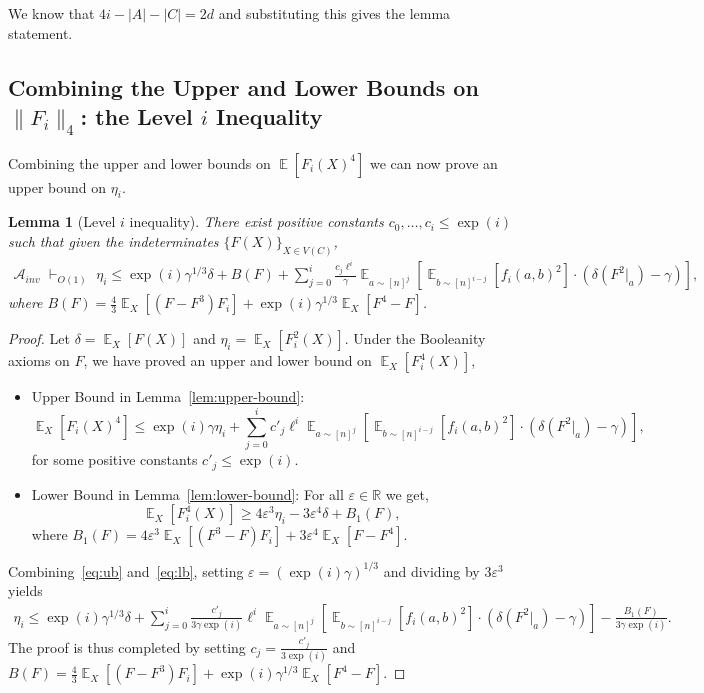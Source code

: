 \documentclass[11pt]{article}
\DeclareMathOperator*{\E}{\mathbb{E}}
\def \R {\mathbb{R}}
\def \cA {\mathcal{A}}
\def \eps {{\varepsilon}}
\newtheorem{lemma}[theorem]{Lemma}
\theoremstyle{definition}
\begin{document}
We know that $4i - |A|-|C| = 2d$ and substituting this gives the lemma statement.




\subsection{Combining the Upper and Lower Bounds on $\|F_i\|_4$: the Level $i$ Inequality}
Combining the upper and lower bounds on $\E[F_i(X)^4]$ we can now prove an upper bound on $\eta_i$.

\begin{lemma}[Level $i$ inequality]\label{lem:leveli-j}
There exist positive constants $c_0,\ldots,c_i \leq \exp(i)$ such that given the indeterminates $\{F(X)\}_{X \in V(C)}$,
\begin{align*}
\cA_{inv} \,\, \vdash_{O(1)}\,\, 
\eta_i \leq \exp(i)\gamma^{1/3}\delta + B(F) + \sum_{j = 0}^i  \frac{c_j\ell^{i}}{\gamma}\E_{a \sim [n]^{j}}[\E_{b \sim [n]^{i-j}}[f_i(a,b)^2]\cdot (\delta(F^{ 2}|_a) - \gamma)],
\end{align*}
where $B(F) =  \frac{4}{3}\E_X[(F - F^{ 3})F_i] + \exp(i)\gamma^{1/3}\E_X[F^{ 4} - F]$.
\end{lemma}

\begin{proof}
Let $\delta = \E_X[F(X)]$ and $\eta_i = \E_X[F_i^2(X)]$. Under the Booleanity axioms on $F$, we have proved an upper and lower bound on ${\E_X[F_i^4(X)]}$,
\begin{itemize}
    \item Upper Bound in Lemma~\ref{lem:upper-bound}:
\begin{equation}\label{eq:ub}
\E_X[F_i(X)^4] \leq \exp(i)\gamma \eta_i + \sum_{j = 0}^i c'_j \ell^{i}\E_{a \sim [n]^{j}}[\E_{b \sim [n]^{i-j}}[f_i(a,b)^2]\cdot (\delta(F^{2}|_a) - \gamma)],
\end{equation}
for some positive constants $c'_j \leq \exp(i)$.

\item Lower Bound in Lemma~\ref{lem:lower-bound}: For all $\eps \in \R$ we get,
\begin{equation}\label{eq:lb}
\E_X[F_i^4(X)] \geq 4\eps^3 \eta_i - 3\eps^4\delta + B_1(F),
\end{equation}
where $B_1(F) = 4\eps^3\E_X[(F^{ 3} - F)F_i]+3\eps^4 \E_X[F - F^{ 4}]$.
\end{itemize}

Combining~\eqref{eq:ub} and~\eqref{eq:lb}, 
setting $\eps = (\exp(i)\gamma)^{1/3}$ and dividing 
by $3\eps^3$ yields
\begin{align*}
\eta_i \leq \exp(i)\gamma^{1/3}\delta + \sum_{j = 0}^i \frac{c'_j}{3\gamma\exp(i)} \ell^{i}\E_{a \sim [n]^{j}}[\E_{b \sim [n]^{i-j}}[f_i(a,b)^2]\cdot (\delta(F^{ 2}|_a) - \gamma)] - \frac{B_1(F)}{3\gamma \exp(i)}.
\end{align*}
The proof is thus completed by setting $c_j = \frac{c'_j}{3\exp(i)}$ and 
$B(F) = \frac{4}{3}\E_X[(F - F^{ 3})F_i] + \exp(i)\gamma^{1/3}\E_X[F^{ 4} - F]$.
\end{proof}
\end{document}
